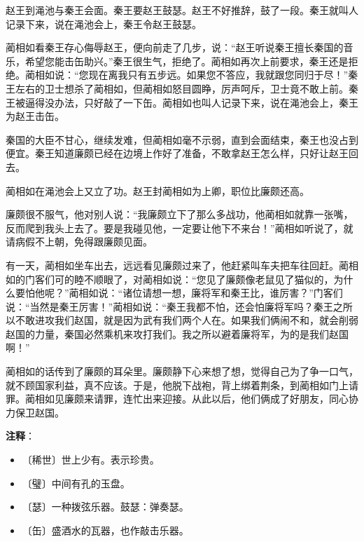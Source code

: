 \documentclass[12pt,UTF-8,openany]{ctexbook}
\begin{document}
\begin{large}
    赵王到渑池与秦王会面。秦王要赵王鼓瑟。赵王不好推辞，鼓了一段。秦王就叫人记录下来，说在渑池会上，秦王令赵王鼓瑟。
    
    蔺相如看秦王存心侮辱赵王，便向前走了几步，说：“赵王听说秦王擅长秦国的音乐，希望您能击缶助兴。”秦王很生气，拒绝了。蔺相如再次上前要求，秦王还是拒绝。蔺相如说：“您现在离我只有五步远。如果您不答应，我就跟您同归于尽！”秦王左右的卫士想杀了蔺相如，但蔺相如怒目圆睁，厉声呵斥，卫士竟不敢上前。秦王被逼得没办法，只好敲了一下缶。蔺相如也叫人记录下来，说在渑池会上，秦王为赵王击缶。
    
    秦国的大臣不甘心，继续发难，但蔺相如毫不示弱，直到会面结束，秦王也没占到便宜。秦王知道廉颇已经在边境上作好了准备，不敢拿赵王怎么样，只好让赵王回去。
    
    蔺相如在渑池会上又立了功。赵王封蔺相如为上卿，职位比廉颇还高。
    
    廉颇很不服气，他对别人说：“我廉颇立下了那么多战功，他蔺相如就靠一张嘴，反而爬到我头上去了。要是我碰见他，一定要让他下不来台！”蔺相如听说了，就请病假不上朝，免得跟廉颇见面。
    
    有一天，蔺相如坐车出去，远远看见廉颇过来了，他赶紧叫车夫把车往回赶。蔺相如的门客们可的睦不顺眼了，对蔺相如说：“您见了廉颇像老鼠见了猫似的，为什么要怕他呢？”蔺相如说：“诸位请想一想，廉将军和秦王比，谁厉害？”门客们说：“当然是秦王厉害！”蔺相如说：“秦王我都不怕，还会怕廉将军吗？秦王之所以不敢进攻我们赵国，就是因为武有我们两个人在。如果我们俩闹不和，就会削弱赵国的力量，秦国必然乘机来攻打我们。我之所以避着廉将军，为的是我们赵国啊！”
    
    蔺相如的话传到了廉颇的耳朵里。廉颇静下心来想了想，觉得自己为了争一口气，就不顾国家利益，真不应该。于是，他脱下战袍，背上绑着荆条，到蔺相如门上请罪。蔺相如见廉颇来请罪，连忙出来迎接。从此以后，他们俩成了好朋友，同心协力保卫赵国。
    
\end{large}


\newpage

\textbf{注释}：

\vspace{-1em}

\begin{itemize}
    \setlength\itemsep{-0.2em}
    \item 〔稀世〕世上少有。表示珍贵。
    \item 〔璧〕中间有孔的玉盘。
    \item 〔瑟〕一种拨弦乐器。鼓瑟：弹奏瑟。
    \item 〔缶〕盛酒水的瓦器，也作敲击乐器。
\end{itemize}
\end{document}
